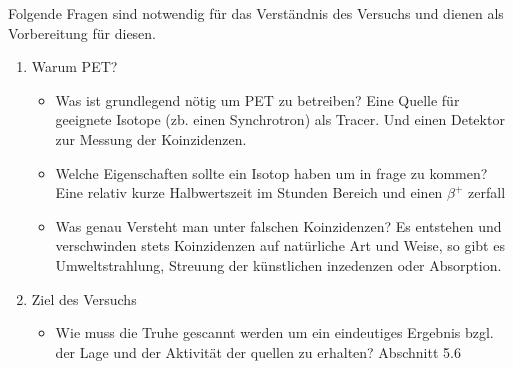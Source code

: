 \documentclass{article}
\begin{document}
        Folgende Fragen sind notwendig für das Verständnis des Versuchs und dienen als Vorbereitung für diesen.
        \begin{enumerate}
            
            
            \item Warum PET?
            \begin{itemize}
                \item Was ist grundlegend nötig um PET zu betreiben?
                    Eine Quelle für geeignete Isotope (zb. einen Synchrotron) als Tracer. Und einen Detektor zur Messung der Koinzidenzen.
                \item Welche Eigenschaften sollte ein Isotop haben um in frage zu kommen?
                    Eine relativ kurze Halbwertszeit im Stunden Bereich und einen $\beta^+$ zerfall
                \item Was genau Versteht man unter falschen Koinzidenzen?
                    Es entstehen und verschwinden stets Koinzidenzen auf natürliche Art und Weise, so gibt es Umweltstrahlung, Streuung der künstlichen inzedenzen oder Absorption.
            \end{itemize}

            \item Ziel des Versuchs
            \begin{itemize}
                \item Wie muss die Truhe gescannt werden um ein eindeutiges Ergebnis bzgl. der Lage und der Aktivität der quellen zu erhalten?
                Abschnitt 5.6
            \end{itemize}


\end{enumerate}
\end{document}
